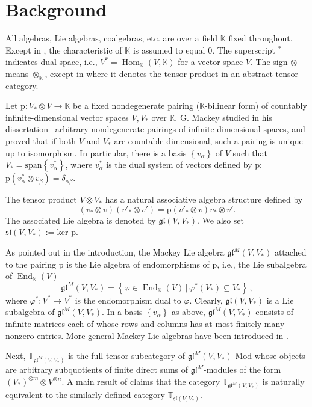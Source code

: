 \documentclass[11pt]{article}
\theoremstyle{plain}
\theoremstyle{nonumberplain}
\theoremstyle{plain}
\theoremstyle{nonumberplain}
\newcommand\bK{{\mathbb K}}
\newcommand\bT{{\mathbb T}}
\newcommand\fgl{\mathfrak{gl}}
\newcommand\fsl{\mathfrak{sl}}
\DeclareMathOperator{\End}{\mathrm{End}}
\DeclareMathOperator{\Hom}{\mathrm{Hom}}
\begin{document}
\section{Background}\label{se.prel}

All algebras, Lie algebras, coalgebras, etc. are over a field $\bK$ fixed throughout.  Except in , the characteristic of $\bK$ is assumed to equal $0$.  The superscript $^*$ indicates dual space, i.e., $V^*=\Hom_\bK(V,\bK)$ for a vector space $V$.  The sign $\otimes$ means $\otimes_\bK$, except in  where it denotes the tensor product in an abstract tensor category.

Let $\mathrm{p}:V_*\otimes V\to\bK$ be a fixed nondegenerate pairing ($\bK$-bilinear form) of countably infinite-dimensional vector spaces $V,V_*$ over $\bK$.   G. Mackey studied in his dissertation~\cite{X} arbitrary nondegenerate pairings of infinite-dimensional spaces, and proved that if both $V$ and $V_*$ are countable dimensional, such a pairing is unique up to isomorphism.  In particular, there is a basis $\left\{v_\alpha\right\}$ of $V$ such that $V_*=\mathrm{span}\left\{v_\alpha^*\right\}$, where $v_\alpha^*$ is the dual system of vectors defined by $\mathrm{p}$: $\mathrm{p}\left(v_\alpha^*\otimes v_\beta\right)=\delta_{\alpha\beta}$.

The tensor product $V\otimes V_*$ has a natural associative algebra structure defined by
\begin{equation*}
  (v_*\otimes v)(v'_*\otimes v') = \mathrm{p}(v'_*\otimes v)v_*\otimes v'.
\end{equation*}
The associated Lie algebra is denoted by $\fgl(V,V_*)$. We also set $\fsl(V,V_*):=\mathrm{ker}$ $\mathrm{p}$.  

As pointed out in the introduction, the Mackey Lie algebra $\fgl^M\left(V,V_*\right)$ attached to the pairing $\mathrm{p}$ is the Lie algebra of endomorphisms of $\mathrm{p}$, i.e., the Lie subalgebra of $\End_\bK(V)$ 
$$\fgl^M\left(V,V_*\right)=\left\{\varphi\in \End_\bK(V)\,\big|\,\varphi^*\left(V_*\right)\subseteq V_*\right\}\,,$$
where $\varphi^*:V^*\to V^*$ is the endomorphism dual to $\varphi$.  Clearly, $\fgl(V,V_*)$ is a Lie subalgebra of $\fgl^M(V,V_*)$. In a basis $\left\{v_\alpha\right\}$ as above, $\fgl^M\left(V,V_*\right)$ consists of infinite matrices each of whose rows and columns has at most finitely many nonzero entries.  More general Mackey Lie algebras have been introduced in {\cite{PS2}}.

Next, $\bT_{\fgl^M\left(V,V_*\right)}$ is the full tensor subcategory of $\fgl^M\left(V,V_*\right)\text{-}\mathrm{Mod}$ whose objects are arbitrary subquotients of finite direct sums of $\fgl^M$-modules of the form $ \left( V_*\right)^{\otimes m}\otimes V^{\otimes n}$.  A main result of {\cite{PS2}} claims that the category $\bT_{\fgl^M\left(V,V_*\right)}$ is naturally equivalent to the similarly defined category $\bT_{\fsl\left(V,V_*\right)}$. 
\end{document}
